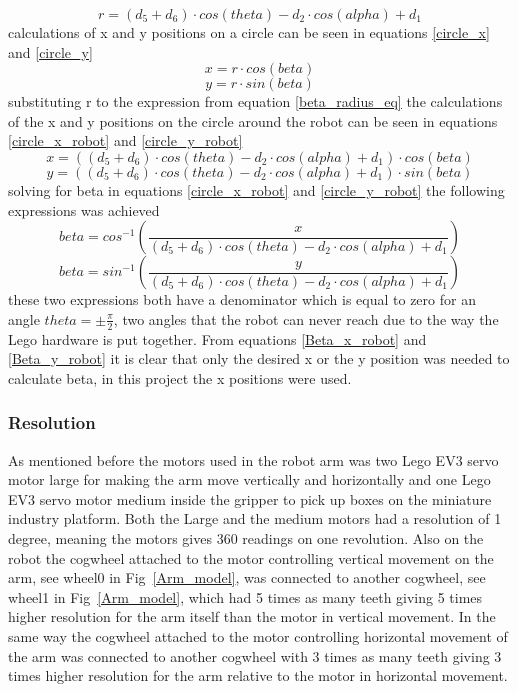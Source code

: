 \begin{equation}
    r = (d_5 + d_6)\cdot cos(theta) - d_2\cdot cos(alpha) + d_1
    \label{beta_radius_eq}
\end{equation}
calculations of x and y positions on a circle can be seen in equations \ref{circle_x} and \ref{circle_y}
\begin{equation}
    x = r\cdot cos(beta)
    \label{circle_x}
\end{equation}
\begin{equation}
    y = r\cdot sin(beta)
    \label{circle_y}
\end{equation}
substituting r to the expression from equation \ref{beta_radius_eq} the calculations of the x and y positions on the circle around the robot can be seen in equations \ref{circle_x_robot} and \ref{circle_y_robot}
\begin{equation}
    x = ((d_5 + d_6)\cdot cos(theta) - d_2\cdot cos(alpha) + d_1)\cdot cos(beta)
    \label{circle_x_robot}
\end{equation}
\begin{equation}
    y = ((d_5 + d_6)\cdot cos(theta) - d_2\cdot cos(alpha) + d_1)\cdot sin(beta)
    \label{circle_y_robot}
\end{equation}
solving for beta in equations \ref{circle_x_robot} and \ref{circle_y_robot} the following expressions was achieved 
\begin{equation}
    beta = cos^{-1}(\frac{x}{(d_5 + d_6)\cdot cos(theta) - d_2\cdot cos(alpha) + d_1})
    \label{Beta_x_robot}
\end{equation}
\begin{equation}
    beta = sin^{-1}(\frac{y}{(d_5 + d_6)\cdot cos(theta) - d_2\cdot cos(alpha) + d_1})
    \label{Beta_y_robot}
\end{equation}
these two expressions both have a denominator which is equal to zero for an angle \(theta = \pm \frac{\pi}{2}\), two angles that the robot can never reach due to the way the Lego hardware is put together.
From equations \ref{Beta_x_robot} and \ref{Beta_y_robot} it is clear that only the desired x or the y position was needed to calculate beta, in this project the x positions were used.
\subsubsection{Resolution}
As mentioned before the motors used in the robot arm was two Lego EV3 servo motor large for making the arm move vertically and horizontally and one Lego EV3 servo motor medium inside the gripper to pick up boxes on the miniature industry platform. Both the Large and the medium motors had a resolution of 1 degree, meaning the motors gives 360 readings on one revolution. Also on the robot the cogwheel attached to the motor controlling vertical movement on the arm, see wheel0 in Fig~\ref{Arm_model}, was connected to another cogwheel, see wheel1 in Fig~\ref{Arm_model}, which had 5 times as many teeth giving 5 times higher resolution for the arm itself than the motor in vertical movement. In the same way the cogwheel attached to the motor controlling horizontal movement of the arm was connected to another cogwheel with 3 times as many teeth giving 3 times higher resolution for the arm relative to the motor in horizontal movement.
